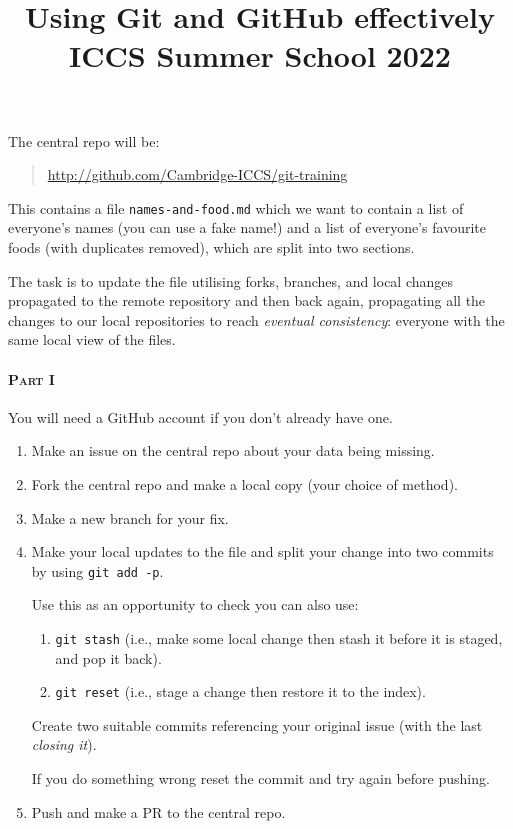 \documentclass[a4paper]{article}
\title{Using Git and GitHub effectively \\ ICCS Summer School 2022}
\date{}
\begin{document}
\vspace{-4em}
\maketitle
\vspace{-2em}

\noindent
The central repo will be:

\begin{quote}
\url{http://github.com/Cambridge-ICCS/git-training}
\end{quote}

This contains a file \texttt{names-and-food.md} which we want to contain a list of everyone's names (you can use a fake name!) and a list of everyone's favourite foods (with duplicates removed), which are split into two sections.

The task is to update the file utilising forks, branches, and local changes propagated to the remote repository and then back again, propagating all the changes to our local repositories to reach \emph{eventual consistency}: everyone with the same local view of the files.

\paragraph{ \textsc{Part I}} You will need a GitHub account if you don't
already have one.

\begin{enumerate}
\item Make an issue on the central repo about your data being missing.
\item Fork the central repo and make a local copy (your choice of method).
\item Make a new branch for your fix.
\item Make your local updates to the file and split your change into two commits by using \texttt{git add -p}.

Use this as an opportunity to check you can also use:

\begin{enumerate}
\item \texttt{git stash} (i.e., make some local change then stash it
before it is staged, and pop it back).
\item \texttt{git reset} (i.e., stage a change then restore it to the index).
\end{enumerate}

Create two suitable commits referencing your original issue (with
the last \emph{closing it}).

If you do something wrong reset the commit and try again before pushing.

\item Push and make a PR to the central repo.
\end{enumerate}
\end{document}
